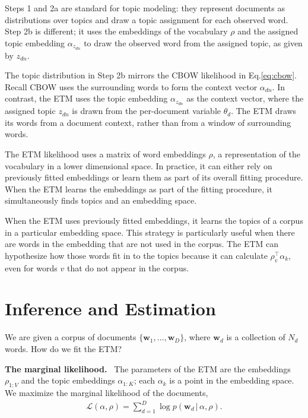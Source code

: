 \documentclass[11pt,a4paper]{article}
\DeclareRobustCommand{\parhead}[1]{\noindent\textbf{#1}~}
\newcommand{\g}{\, | \,}
\newcommand{\bw}{\mathbf{w}}
\newcommand{\cL}{\mathcal{L}}
\begin{document}
Steps 1 and 2a are standard for topic modeling: they represent
documents as distributions over topics and draw a topic assignment for
each observed word. Step 2b is different; it uses the embeddings of
the vocabulary $\rho$ and the assigned topic embedding
$\alpha_{z_{dn}}$ to draw the observed word from the assigned topic, as
given by $z_{dn}$.

The topic distribution in Step 2b mirrors the \gls{CBOW} likelihood in
Eq.\nobreakspace \ref {eq:cbow}. Recall \gls{CBOW} uses the surrounding words to form
the context vector $\alpha_{dn}$.  In contrast, the \gls{ETM} uses the
topic embedding $\alpha_{z_{dn}}$ as the context vector, where the
assigned topic $z_{dn}$ is drawn from the per-document variable
$\theta_d$.  The \gls{ETM} draws its words from a document context,
rather than from a window of surrounding words.



The \gls{ETM} likelihood uses a matrix of word embeddings $\rho$, a
representation of the vocabulary in a lower dimensional space.  In
practice, it can either rely on previously fitted embeddings or learn
them as part of its overall fitting procedure.  When the \gls{ETM}
learns the embeddings as part of the fitting procedure, it
simultaneously finds topics and an embedding space.

When the \gls{ETM} uses previously fitted embeddings, it learns the
topics of a corpus in a particular embedding space.  This strategy is
particularly
useful when there are words in the embedding that are not used in the
corpus.  The \gls{ETM} can hypothesize how those words fit in to the
topics because it can calculate $\rho_v^\top \alpha_k$, even for words
$v$ that do not appear in the corpus.












 
\section{Inference and Estimation}
\label{sec:inference}

We are given a corpus of documents $\{\bw_{1}, \ldots, \bw_{D}\}$,
where $\bw_d$ is a collection of $N_d$ words.  How do we fit the
\gls{ETM}?

\parhead{The marginal likelihood.} The parameters of the \gls{ETM} are
the embeddings $\rho_{1:V}$ and the topic embeddings
$\alpha_{1:K}$; each $\alpha_k$ is a point
in the embedding space.  We maximize the marginal likelihood of the
documents,
\begin{align}
  \label{eq:marginal}
  \cL(\alpha, \rho) = \sum_{d=1}^{D} \log p(\bw_d \g \alpha, \rho).
\end{align}
\end{document}

